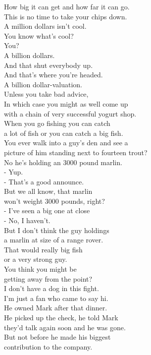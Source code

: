 \documentclass{article}
\begin{document}
\begin{multicols}{3}
How big it can get and how far it can go.\\
This is no time to take your chips down.\\
A million dollars isn't cool.\\
You know what's cool?\\
You?\\
A billion dollars.\\
And that shut everybody up.\\
And that's where you're headed.\\
A billion dollar-valuation.\\
Unless you take bad advice,\\
In which case you might as well come up\\
with a chain of very successful yogurt shop.\\
When you go fishing you can catch\\
a lot of fish or you can catch a big fish.\\
You ever walk into a guy's den and see a\\
picture of him standing next to fourteen trout?\\
No he's holding an 3000 pound marlin.\\
- Yup.\\
- That's a good announce.\\
But we all know, that marlin\\
won't weight 3000 pounds, right?\\
- I've seen a big one at close\\
- No, I haven't.\\
But I don't think the guy holdings\\
a marlin at size of a range rover.\\
That would really big fish\\
or a very strong guy.\\
You think you might be\\
getting away from the point?\\
I don't have a dog in this fight.\\
I'm just a fan who came to say hi.\\
He owned Mark after that dinner.\\
He picked up the check, he told Mark\\
they'd talk again soon and he was gone.\\
But not before he made his biggest\\
contribution to the company.\\

\end{multicols}
\end{document}
